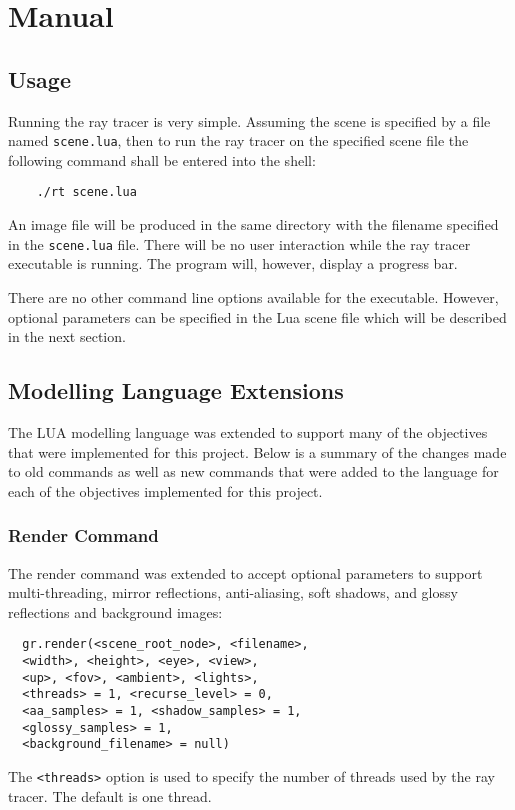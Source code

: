 \chapter{Manual}

\section{Usage}
Running the ray tracer is very simple. Assuming the scene is specified by a file
named \verb|scene.lua|, then to run the ray tracer on the specified scene file
the following command shall be entered into the shell:
\begin{lstlisting}
    ./rt scene.lua
\end{lstlisting}
An image file will be produced in the same directory with the filename specified
in the  \verb|scene.lua| file. There will be no user interaction while the ray
tracer executable is running. The program will, however, display a progress bar.

There are no other command line options available for the executable. However,
optional parameters can be specified in the Lua scene file which will be
described in the next section.

\section{Modelling Language Extensions}
The LUA modelling language was extended to support many of the objectives that
were implemented for this project. Below is a summary of the changes made to old
commands as well as new commands that were added to the language for each of the
objectives implemented for this project.

\subsection*{Render Command}
The render command was extended to accept optional parameters to support
multi-threading, mirror reflections, anti-aliasing, soft shadows, and glossy
reflections and background images:
\begin{lstlisting}
  gr.render(<scene_root_node>, <filename>, 
  <width>, <height>, <eye>, <view>,
  <up>, <fov>, <ambient>, <lights>, 
  <threads> = 1, <recurse_level> = 0,
  <aa_samples> = 1, <shadow_samples> = 1, 
  <glossy_samples> = 1, 
  <background_filename> = null)
\end{lstlisting}
The \verb|<threads>| option is used to specify the number of threads used by the
ray tracer. The default is one thread.

